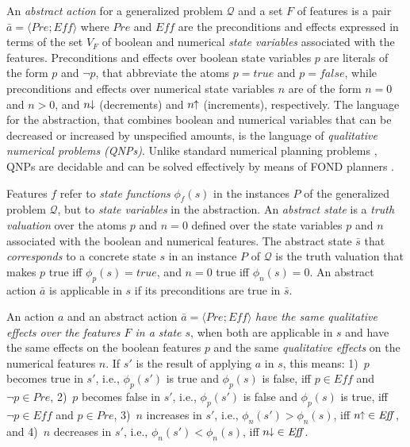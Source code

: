 \documentclass[letterpaper]{article} %
\newcommand{\tup}[1]{\langle #1 \rangle}
\newcommand{\Q}{\mathcal{Q}}
\newcommand{\Eff}{{\mathit{Eff}}}
\newcommand{\abst}[2]{\tup{#1;#2}}
\newcommand{\pplus}{\hspace{-.05em}\raisebox{.15ex}{\footnotesize$\uparrow$}}
\newcommand{\mminus}{\hspace{-.05em}\raisebox{.15ex}{\footnotesize$\downarrow$}}
\begin{document}
An \emph{abstract action}  for a generalized problem $\Q$ and a set $F$ of features
is a pair $\bar{a}=\abst{Pre}{\Eff}$ where $Pre$ and $\Eff$ are the  preconditions
and effects expressed in terms of the  set $V_F$ of boolean and numerical \emph{state variables}
associated with the features. Preconditions and effects over boolean state variables $p$ are literals of the form $p$
and $\neg p$, that abbreviate the  atoms $p=true$ and $p=false$, while
preconditions and effects over  numerical state variables $n$ are of  the form $n=0$ and $n > 0$,
and   $n\mminus$ (decrements) and  $n\pplus$ (increments), respectively.
The language for the abstraction,  that combines boolean and numerical variables
that can be decreased or increased by unspecified amounts, is the language of \emph{qualitative numerical problems (QNPs)}.
Unlike standard numerical planning problems \cite{helmert:numerical}, QNPs
are decidable and can be solved effectively by means of  FOND planners \cite{srivastava:aaai2011,bonet:ijcai2017}.


Features $f$ refer to \emph{state functions} $\phi_f(s)$ in the instances $P$ 
of the generalized problem $\Q$, but  to \emph{state variables} in  the abstraction.
An \emph{abstract state} is  a \emph{truth valuation} over
the atoms $p$ and $n=0$ defined over the state variables $p$ and $n$
associated with the boolean and  numerical features.
The abstract state $\bar{s}$ that \emph{corresponds} to a concrete state $s$
in an instance $P$ of $\Q$ is the truth valuation that makes $p$ true iff $\phi_p(s)=true$,
and $n=0$ true iff $\phi_n(s) = 0$. An abstract action $\bar{a}$ is applicable in  $s$
if its preconditions
are true in $\bar{s}$. 

An action $a$ and an abstract action $\bar{a}=\abst{Pre}{\Eff}$  \emph{have  the same qualitative effects over the features $F$
in a state $s$}, when both are applicable in $s$ and have the same effects on the boolean features $p$ and
the same \emph{qualitative effects} on the numerical features $n$. If $s'$ is the result of applying $a$ in $s$, this means: 
1)~$p$ becomes true in $s'$,
i.e., $\phi_p(s')$ is true and $\phi_p(s)$  is false,
iff $p \in \Eff$ and $\neg p \in Pre$, 2)~$p$ becomes false in $s'$, i.e., $\phi_p(s')$ is false and $\phi_p(s)$  is true,
iff $\neg p \in \Eff$ and $p \in Pre$, 3)~$n$ increases in $s'$, i.e., $\phi_n(s') > \phi_n(s)$, iff $n\pplus \in \Eff$,
and 4)~$n$ decreases  in $s'$, i.e., $\phi_n(s') < \phi_n(s)$, iff $n\mminus \in \Eff$.
\end{document}

